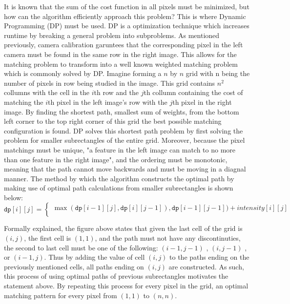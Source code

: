 \documentclass[11pt]{scrartcl}
\begin{document}
It is known that the sum of the cost function in all pixels must be minimized, but how can 
the algorithm efficiently approach this problem? This is where Dynamic Programming (DP)
must be used. DP is a optimization technique which increases runtime by breaking a general 
problem into subproblems.  As mentioned previously, camera calibration garuntees that the corresponding 
pixel in the left camera must be found in the same row in the right image. This allows for the 
matching problem to transform into a well known weighted matching problem which is commonly  
solved by DP. Imagine forming a $n$ by $n$ grid with n being the number of pixels in row 
being studied in the image. This grid contains $n^2$ collumns with the cell in the 
$i$th row and the $j$th collumn containing the cost of matching the $i$th pixel in the 
left image's row with the $j$th pixel in the right image. By finding the shortest path, 
smallest sum of weights, from the bottom left corner to the top right corner of this 
grid the best possible matching configuration is found. DP solves this shortest path problem 
by first solving the problem for smaller subrectangles of the entire grid. Moreover, because 
the pixel matchings must be unique, "a feature in the left image can match to no more than one 
feature in the right image", and the ordering must be monotonic, meaning that the path cannot 
move backwards and must be moving in a diagnal manner. The method by which the algorithm constructs 
the optimal path by making use of optimal path calculations from smaller subrectangles is shown below: 
\[
    \texttt{dp}[i][j] =
\begin{cases}
    \max(\texttt{dp}[i-1][j], \texttt{dp}[i][j-1]), \texttt{dp}[i-1][j-1]) + intensity[i][j] \\

\end{cases}
\]
\begin{remark}
    Formally explained, the figure above states that given the last cell of the grid 
    is $(i,j)$, the first cell is $(1,1)$, and the path must not have any discontinuties, 
    the second to last cell must be one of the following: $(i-1, j-1)$ , $(i, j-1)$ , or 
    $(i-1, j)$. Thus by adding the value of cell $(i, j)$ to the paths ending on the previously
    mentioned cells, all paths ending on $(i,j)$ are constructed. As such, this process of 
    using optimal paths of previous subrectangles motivates the statement above. By repeating 
    this process for every pixel in the grid, an optimal matching pattern for every pixel from 
    $(1,1)$ to $(n,n)$. 
\end{remark}
\end{document}
